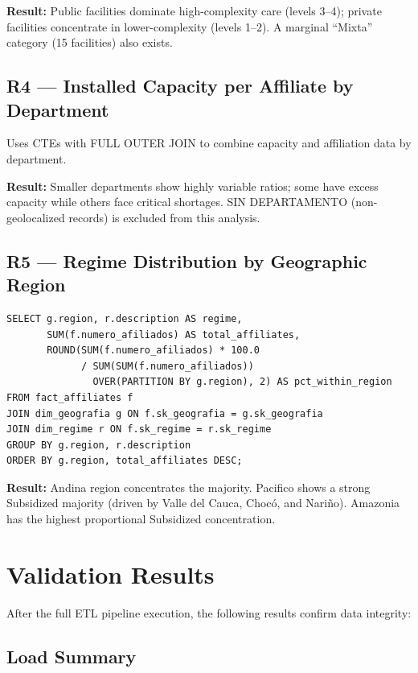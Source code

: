 \documentclass[12pt,a4paper]{article}
\begin{document}
\textbf{Result:} Public facilities dominate high-complexity care (levels 3--4); private facilities concentrate in lower-complexity (levels 1--2). A marginal ``Mixta'' category (15 facilities) also exists.

\subsection{R4 --- Installed Capacity per Affiliate by Department}

Uses CTEs with FULL OUTER JOIN to combine capacity and affiliation data by department.

\textbf{Result:} Smaller departments show highly variable ratios; some have excess capacity while others face critical shortages. SIN DEPARTAMENTO (non-geolocalized records) is excluded from this analysis.

\subsection{R5 --- Regime Distribution by Geographic Region}

\begin{lstlisting}
SELECT g.region, r.description AS regime,
       SUM(f.numero_afiliados) AS total_affiliates,
       ROUND(SUM(f.numero_afiliados) * 100.0
             / SUM(SUM(f.numero_afiliados))
               OVER(PARTITION BY g.region), 2) AS pct_within_region
FROM fact_affiliates f
JOIN dim_geografia g ON f.sk_geografia = g.sk_geografia
JOIN dim_regime r ON f.sk_regime = r.sk_regime
GROUP BY g.region, r.description
ORDER BY g.region, total_affiliates DESC;
\end{lstlisting}

\textbf{Result:} Andina region concentrates the majority. Pacifico shows a strong Subsidized majority (driven by Valle del Cauca, Choc\'{o}, and Nari\~{n}o). Amazonia has the highest proportional Subsidized concentration.

\section{Validation Results}

After the full ETL pipeline execution, the following results confirm data integrity:

\subsection{Load Summary}
\end{document}
